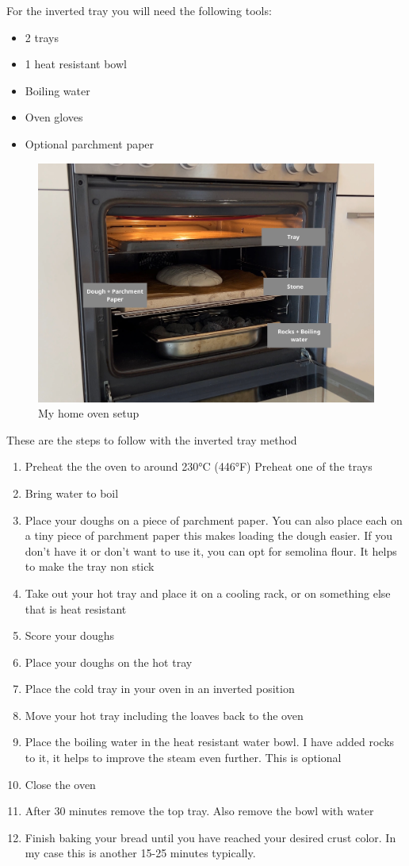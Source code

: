 For the inverted tray you will need the following tools:
\begin{itemize}
\item 2 trays
\item 1 heat resistant bowl
\item Boiling water
\item Oven gloves
\item Optional parchment paper
\end{itemize}

\begin{figure}[!htb]
  \includegraphics[width=\textwidth]{baking-example.jpg}
  \caption{My home oven setup}
\end{figure}

These are the steps to follow with the inverted tray method
\begin{enumerate}
\item Preheat the the oven to around 230°C (446°F)
Preheat one of the trays
\item Bring water to boil
\item Place your doughs on a piece of parchment paper. You
can also place each on a tiny piece of parchment paper
this makes loading the dough easier. If you don't
have it or don't want to use it, you can opt for 
semolina flour. It helps to make the tray non stick
\item Take out your hot tray and place it
on a cooling rack, or on something else that
is heat resistant
\item Score your doughs
\item Place your doughs on the hot tray
\item Place the cold tray in your oven in an inverted position
\item Move your hot tray including the loaves back
to the oven
\item Place the boiling water in the heat resistant
water bowl. I have added rocks to it, it helps
to improve the steam even further. This is optional
\item Close the oven
\item After 30 minutes remove the top tray. Also remove the bowl with water
\item Finish baking your bread until you have reached your desired
crust color. In my case this is another 15-25 minutes typically.
\end{enumerate}


